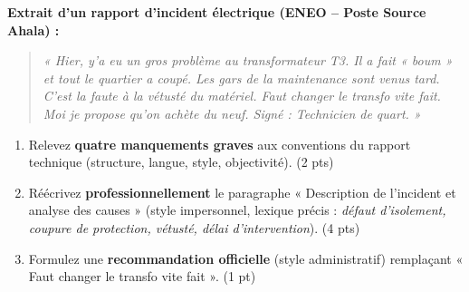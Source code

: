 \documentclass[11pt]{article}
\begin{document}
\begin{exercice}
    \textbf{Extrait d'un rapport d'incident électrique (ENEO -- Poste Source Ahala) :}
    \begin{quote}
    \textit{« Hier, y'a eu un gros problème au transformateur T3. Il a fait « boum » et tout le quartier a coupé. Les gars de la maintenance sont venus tard. C'est la faute à la vétusté du matériel. Faut changer le transfo vite fait. Moi je propose qu'on achète du neuf. Signé : Technicien de quart. »}
    \end{quote}
    
    \begin{enumerate}
        \item Relevez \textbf{quatre manquements graves} aux conventions du rapport technique (structure, langue, style, objectivité). (2 pts)
        \item Réécrivez \textbf{professionnellement} le paragraphe « Description de l'incident et analyse des causes » (style impersonnel, lexique précis : \textit{défaut d'isolement, coupure de protection, vétusté, délai d'intervention}). (4 pts)
        \item Formulez une \textbf{recommandation officielle} (style administratif) remplaçant « Faut changer le transfo vite fait ». (1 pt)
    \end{enumerate}
\end{exercice}
\end{document}
